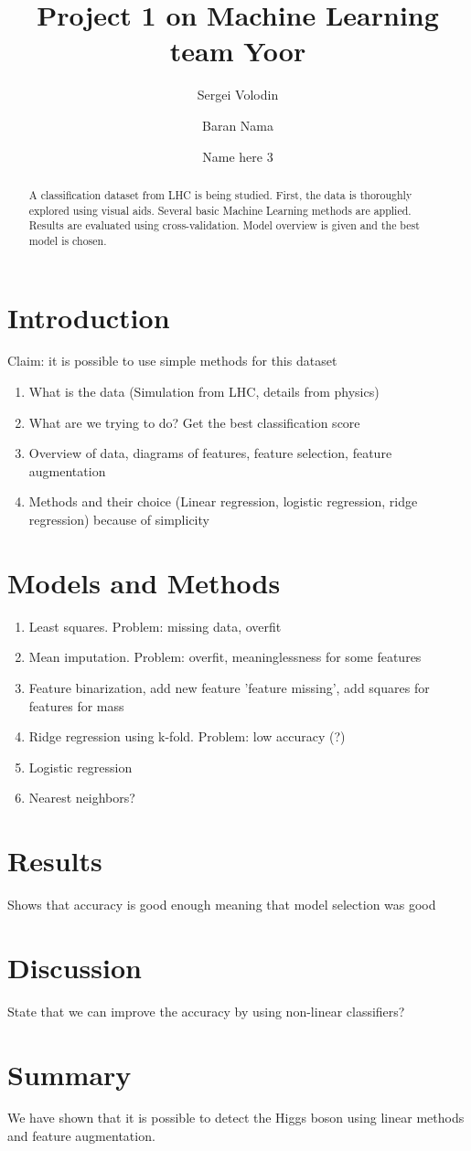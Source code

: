 \documentclass[10pt,conference,compsocconf]{IEEEtran}
\title{Project 1 on Machine Learning team Yoor}
\author[1]{Sergei Volodin}
\author[1]{Baran Nama}
\author[1]{Name here 3}
\affil[1]{EPFL}
\affil[ ]{\textit {\{sergei.volodin,baran.nama,email3\}@epfl.ch}}
\begin{document}
\maketitle

\begin{abstract}
A classification dataset from LHC is being studied. First, the data is thoroughly explored using visual aids.
Several basic Machine Learning methods are applied.
Results are evaluated using cross-validation.
Model overview is given and the best model is chosen.
\end{abstract}

\section{Introduction}
Claim: it is possible to use simple methods for this dataset
\begin{enumerate}
	\item What is the data (Simulation from LHC, details from physics)
	\item What are we trying to do? Get the best classification score
	\item Overview of data, diagrams of features, feature selection, feature augmentation
	\item Methods and their choice (Linear regression, logistic regression, ridge regression) because of simplicity
\end{enumerate}
\section{Models and Methods}
\begin{enumerate}
\item Least squares. Problem: missing data, overfit
\item Mean imputation. Problem: overfit, meaninglessness for some features
\item Feature binarization, add new feature 'feature missing', add squares for features for mass
\item Ridge regression using k-fold. Problem: low accuracy (?)
\item Logistic regression
\item Nearest neighbors?
\end{enumerate}
\section{Results}
Shows that accuracy is good enough meaning that model selection was good
\section{Discussion}
State that we can improve the accuracy by using non-linear classifiers?
\section{Summary}
We have shown that it is possible to detect the Higgs boson using linear methods and feature augmentation.
\end{document}
